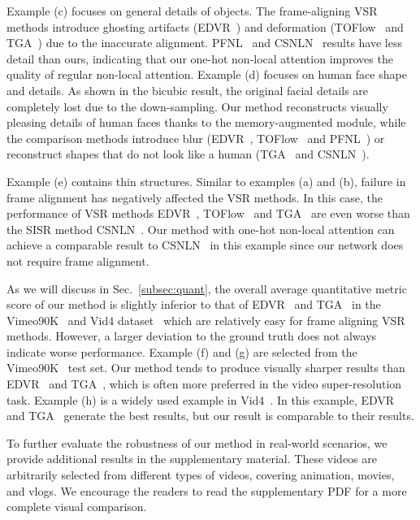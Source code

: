 Example (c) focuses on general details of objects.
The frame-aligning VSR methods introduce ghosting artifacts (EDVR~\cite{edvr}) and deformation (TOFlow~\cite{vimeo90k} and TGA~\cite{tga}) due to the inaccurate alignment.
PFNL~\cite{pfnl} and CSNLN~\cite{mei} results have less detail than ours, indicating that our one-hot non-local attention improves the quality of regular non-local attention.
Example (d) focuses on human face shape and details.
As shown in the bicubic result, the original facial details are completely lost due to the down-sampling.
Our method reconstructs visually pleasing details of human faces thanks to the memory-augmented module, while the comparison methods introduce blur (EDVR~\cite{edvr}, TOFlow~\cite{vimeo90k} and PFNL~\cite{pfnl}) or reconstruct shapes that do not look like a human (TGA~\cite{tga} and CSNLN~\cite{mei}).

Example (e) contains thin structures.
Similar to examples (a) and (b), failure in frame alignment has negatively affected the VSR methods.
In this case, the performance of VSR methods EDVR~\cite{edvr}, TOFlow~\cite{vimeo90k} and TGA~\cite{tga} are even worse than the SISR method CSNLN~\cite{mei}.
Our method with one-hot non-local attention can achieve a comparable result to CSNLN~\cite{mei} in this example since our network does not require frame alignment.

As we will discuss in Sec.~\ref{subsec:quant}, the overall average quantitative metric score of our method is slightly inferior to that of EDVR~\cite{edvr} and TGA~\cite{tga} in the Vimeo90K~\cite{vimeo90k} and Vid4 dataset~\cite{frvsr} which are relatively easy for frame aligning VSR methods.
However, a larger deviation to the ground truth does not always indicate worse performance.
Example (f) and (g) are selected from the Vimeo90K~\cite{vimeo90k} test set.
Our method tends to produce visually sharper results than EDVR~\cite{edvr} and TGA~\cite{tga}, which is often more preferred in the video super-resolution task.
Example (h) is a widely used example in Vid4~\cite{frvsr}.
In this example, EDVR~\cite{edvr} and TGA~\cite{tga} generate the best results, but our result is comparable to their results.

To further evaluate the robustness of our method in real-world scenarios, we provide additional results in the supplementary material.
These videos are arbitrarily selected from different types of videos, covering animation, movies, and vlogs.
We encourage the readers to read the supplementary PDF for a more complete visual comparison.

